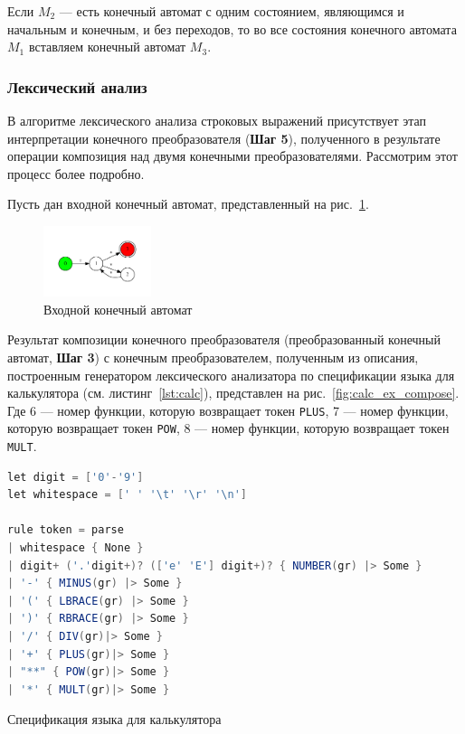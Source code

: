 Если $M_2$ --- есть конечный автомат с одним состоянием, являющимся и начальным и конечным, и без переходов, то во все состояния конечного автомата $M_1$ вставляем конечный автомат $M_3$. 

\subsubsection{Лексический анализ}

В алгоритме лексического анализа строковых выражений присутствует этап интерпретации конечного преобразователя (\textbf{Шаг 5}), полученного в результате операции композиция над двумя конечными преобразователями. Рассмотрим этот процесс более подробно. 

Пусть дан входной конечный автомат, представленный на рис.~\ref{fig:calc_ex}.

\begin{figure}[H]
\begin{center}
\includegraphics[width=0.28\textwidth]{Polubelova/calc_ex}
\caption{Входной конечный автомат}
\label{fig:calc_ex} 
\end{center}
\end{figure}
Результат композиции конечного преобразователя (преобразованный конечный автомат, \textbf{Шаг 3}) с конечным преобразователем, полученным из описания, построенным генератором лексического анализатора по спецификации языка для калькулятора (см. листинг~\ref{lst:calc}), представлен на рис.~\ref{fig:calc_ex_compose}. Где 6 --- номер функции, которую возвращает токен \verb|PLUS|, 7 --- номер функции, которую возвращает токен \verb|POW|, 8 --- номер функции, которую возвращает токен \verb|MULT|.

\begin{listing}[H]
    \begin{lstlisting}[language=csharp,numbers=none]
let digit = ['0'-'9']
let whitespace = [' ' '\t' '\r' '\n']

rule token = parse
| whitespace { None }
| digit+ ('.'digit+)? (['e' 'E'] digit+)? { NUMBER(gr) |> Some }
| '-' { MINUS(gr) |> Some }
| '(' { LBRACE(gr) |> Some }
| ')' { RBRACE(gr) |> Some }
| '/' { DIV(gr)|> Some }
| '+' { PLUS(gr)|> Some }
| "**" { POW(gr)|> Some }
| '*' { MULT(gr)|> Some }
    \end{lstlisting}
\caption{Спецификация языка для калькулятора}
\label{lst:calc}
\end{listing}

